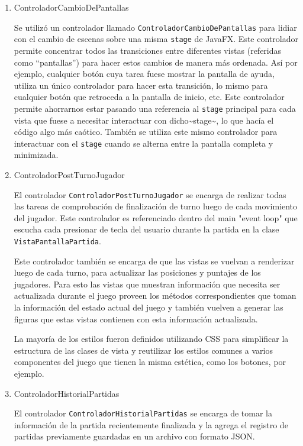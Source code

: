 \documentclass[titlepage,a4paper]{article}
\begin{document}
\begin{enumerate}
\item ControladorCambioDePantallas
\label{sec:org5fa82a9}

Se utilizó un controlador llamado \texttt{ControladorCambioDePantallas} para
lidiar con el cambio de escenas sobre una misma \texttt{stage} de
JavaFX. Este controlador permite concentrar todos las transiciones
entre diferentes vistas (referidas como “pantallas”) para hacer estos
cambios de manera más ordenada. Así por ejemplo, cualquier botón cuya
tarea fuese mostrar la pantalla de ayuda, utiliza un único controlador
para hacer esta transición, lo mismo para cualquier botón que
retroceda a la pantalla de inicio, etc. Este controlador permite
ahorrarnos estar pasando una referencia al \texttt{stage} principal para cada
vista que fuese a necesitar interactuar con dicho\textasciitilde{}stage\textasciitilde{}, lo que hacía
el código algo más caótico. También se utiliza este mismo controlador
para interactuar con el \texttt{stage} cuando se alterna entre la pantalla
completa y minimizada.

\item ControladorPostTurnoJugador
\label{sec:org33b00c4}

El controlador \texttt{ControladorPostTurnoJugador} se encarga de realizar
todas las tareas de comprobación de finalización de turno luego de
cada movimiento del jugador. Este controlador es referenciado dentro
del main "event loop" que escucha cada presionar de tecla del usuario
durante la partida en la clase \texttt{VistaPantallaPartida}.

Este controlador también se encarga de que las vistas se vuelvan a
renderizar luego de cada turno, para actualizar las posiciones y
puntajes de los jugadores. Para esto las vistas que muestran
información que necesita ser actualizada durante el juego proveen los
métodos correspondientes que toman la información del estado actual
del juego y también vuelven a generar las figuras que estas vistas
contienen con esta información actualizada.

La mayoría de los estilos fueron definidos utilizando CSS para
simplificar la estructura de las clases de vista y reutilizar los
estilos comunes a varios componentes del juego que tienen la misma
estética, como los botones, por ejemplo.

\item ControladorHistorialPartidas
\label{sec:orgb2fc2c0}

El controlador \texttt{ControladorHistorialPartidas} se encarga de tomar la
información de la partida recientemente finalizada y la agrega el
registro de partidas previamente guardadas en un archivo con formato
JSON.
\end{enumerate}
\end{document}
